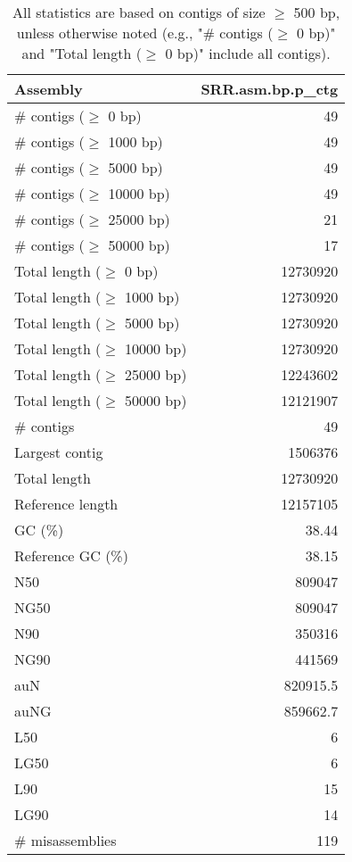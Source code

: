 \documentclass[12pt,a4paper]{article}
\begin{document}
\begin{table}[ht]
\begin{center}
\caption{All statistics are based on contigs of size $\geq$ 500 bp, unless otherwise noted (e.g., "\# contigs ($\geq$ 0 bp)" and "Total length ($\geq$ 0 bp)" include all contigs).}
\begin{tabular}{|l*{1}{|r}|}
\hline
Assembly & SRR.asm.bp.p\_ctg \\ \hline
\# contigs ($\geq$ 0 bp) & 49 \\ \hline
\# contigs ($\geq$ 1000 bp) & 49 \\ \hline
\# contigs ($\geq$ 5000 bp) & 49 \\ \hline
\# contigs ($\geq$ 10000 bp) & 49 \\ \hline
\# contigs ($\geq$ 25000 bp) & 21 \\ \hline
\# contigs ($\geq$ 50000 bp) & 17 \\ \hline
Total length ($\geq$ 0 bp) & 12730920 \\ \hline
Total length ($\geq$ 1000 bp) & 12730920 \\ \hline
Total length ($\geq$ 5000 bp) & 12730920 \\ \hline
Total length ($\geq$ 10000 bp) & 12730920 \\ \hline
Total length ($\geq$ 25000 bp) & 12243602 \\ \hline
Total length ($\geq$ 50000 bp) & 12121907 \\ \hline
\# contigs & 49 \\ \hline
Largest contig & 1506376 \\ \hline
Total length & 12730920 \\ \hline
Reference length & 12157105 \\ \hline
GC (\%) & 38.44 \\ \hline
Reference GC (\%) & 38.15 \\ \hline
N50 & 809047 \\ \hline
NG50 & 809047 \\ \hline
N90 & 350316 \\ \hline
NG90 & 441569 \\ \hline
auN & 820915.5 \\ \hline
auNG & 859662.7 \\ \hline
L50 & 6 \\ \hline
LG50 & 6 \\ \hline
L90 & 15 \\ \hline
LG90 & 14 \\ \hline
\# misassemblies & 119 \\ \hline

\end{tabular}
\end{center}
\end{table}
\end{document}
